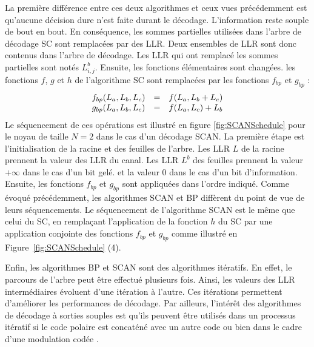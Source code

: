 La première différence entre ces deux algorithmes et ceux vues précédemment est qu'aucune décision dure n'est faite durant le décodage. L'information reste souple de bout en bout.
En conséquence, les sommes partielles utilisées dans l'arbre de décodage SC sont remplacées par des LLR. Deux ensembles de LLR sont donc contenus dans l'arbre de décodage. Les LLR qui ont remplacé les sommes partielles sont notés $L^b_{i,j}$.
Ensuite, les fonctions élémentaires sont changées. les fonctions $f$, $g$ et $h$ de l'algorithme SC sont remplacées par les fonctions $f_{bp}$ et $g_{bp}$ :
\begin{eqnarray}
  \begin{array}{l c l}
    f_{bp}(L_a,L_b,L_c) & = & f(L_a, L_b  + L_c) \\
    g_{bp}(L_a,L_b,L_c) & = & f(L_a, L_c) + L_b
  \end{array}
  \label{eq:bp}
\end{eqnarray}
Le séquencement de ces opérations est illustré en figure \ref{fig:SCANSchedule} pour le noyau de taille $N=2$ dans le cas d'un décodage SCAN. La première étape est l'initialisation de la racine et des feuilles de l'arbre. Les LLR $L$ de la racine prennent la valeur des LLR du canal. Les LLR $L^b$ des feuilles prennent la valeur $+\infty$ dans le cas d'un bit gelé. et la valeur $0$ dans le cas d'un bit d'information. Ensuite, les fonctions $f_{bp}$ et $g_{bp}$ sont appliquées dans l'ordre indiqué.
Comme évoqué précédemment, les algorithmes SCAN et BP diffèrent du point de vue de leurs séquencements. Le séquencement de l'algorithme SCAN est le même que celui du SC, en remplaçant l'application de la fonction $h$ du SC par une application conjointe des fonctions $f_{bp}$ et $g_{bp}$ comme illustré en Figure~\ref{fig:SCANSchedule} (4).

Enfin, les algorithmes BP et SCAN sont des algorithmes itératifs. En effet, le parcours de l'arbre peut être effectué plusieurs fois. Ainsi, les valeurs des LLR intermédiaires évoluent d'une itération à l'autre. Ces itérations permettent d'améliorer les performances de décodage.
Par ailleurs, l'intérêt des algorithmes de décodage à sorties souples est qu'ils peuvent être utilisés dans un processus itératif si le code polaire est concaténé avec un autre code \cite{balatsoukas-stimming_polar_2017} ou bien dans le cadre d'une modulation codée \cite{dai_polar_2016}.

